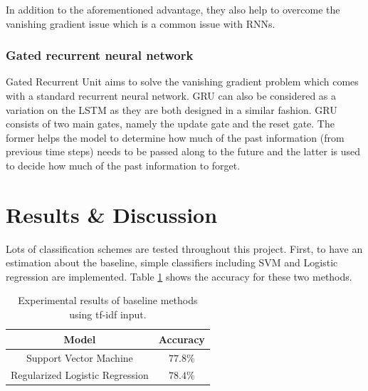 \documentclass[8pt,conference,compsocconf]{IEEEtran}
\begin{document}
In addition to the aforementioned advantage, they also help to overcome the vanishing gradient issue which is a common issue with RNNs.

\subsubsection{Gated recurrent neural network}
Gated Recurrent Unit aims to solve the vanishing gradient problem which comes with a standard recurrent neural network. GRU can also be considered as a variation on the LSTM as they are both designed in a similar fashion. GRU consists of two main gates, namely the update gate and the reset gate. The former helps the model to determine how much of the past information (from previous time steps) needs to be passed along to the future and the latter is used to decide how much of the past information to forget. 
\section{Results \& Discussion} \label{sec:results}
Lots of classification schemes are tested throughout this project. First, to have an estimation about the baseline, simple classifiers including SVM and Logistic regression are implemented. Table \ref{tab:baseline_accuracy} shows the accuracy for these two methods.
\begin{table}[h]
	\centering
	\caption{Experimental results of baseline methods using tf-idf input.}
	\begin{tabular}{|c||c|}
		\hline
		Model &Accuracy\\
		\hline
		Support Vector Machine&  $77.8$\% \\ 
		\hline
		Regularized Logistic Regression&  $78.4$\% \\ 
		\hline
	\end{tabular}
	\label{tab:baseline_accuracy}
\end{table}
\end{document}

